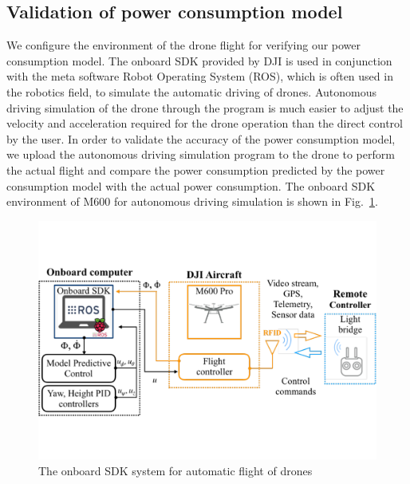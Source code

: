 \documentclass[journal]{./template/IEEEtran}
\begin{document}
\label{Section: Deep Neural networks (DNN)}





\subsection{Validation of power consumption model}

We configure the environment of the drone flight for verifying our power consumption model. 
The onboard SDK provided by DJI is used in conjunction with the meta software Robot Operating System (ROS), which is often used in the robotics field, to simulate the automatic driving of drones. 
Autonomous driving simulation of the drone through the program is much easier to adjust the velocity and acceleration required for the drone operation than the direct control by the user.
In order to validate the accuracy of the power consumption model, we upload the autonomous driving simulation program to the drone to perform the actual flight and compare the power consumption predicted by the power consumption model with the actual power consumption. 
The onboard SDK environment of M600 for autonomous driving simulation is shown in Fig.~\ref{fig:SDK}.

\begin{figure}[htbp]
\centering\includegraphics[scale=0.285]{fig7/SDK.pdf}
\caption{The onboard SDK system for automatic flight of drones}
\label{fig:SDK}
\end{figure}
\end{document}
